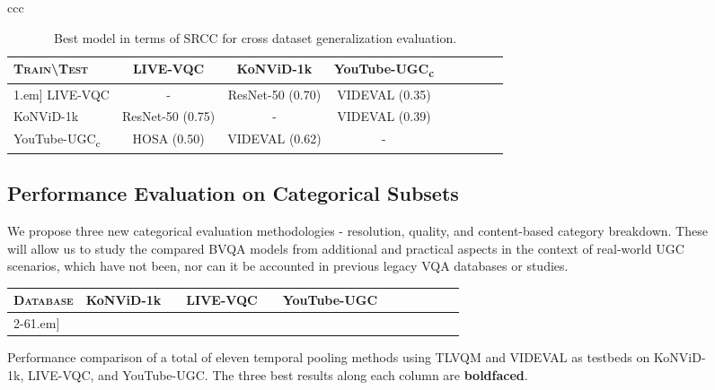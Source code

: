 \documentclass[journal]{IEEEtran}
\begin{document}
\begin{figure}[!t]
\begin{tabular}{ccc}
\begin{table}[!t]
\setlength{\tabcolsep}{3.5pt}
\renewcommand{\arraystretch}{1.1}
\centering
\caption{Best model in terms of SRCC for cross dataset generalization evaluation.}
\label{table:cross_dataset_srcc}
\begin{tabular}{lcccccccc}
\toprule
\textsc{Train}\textbackslash\textsc{Test}  & LIVE-VQC &  KoNViD-1k &  YouTube-UGC\textsubscript{c} \\
\hline\-1.em]
 LIVE-VQC & - &   ResNet-50 (0.70)  & VIDEVAL (0.35)    \\
 KoNViD-1k & ResNet-50 (0.75) & - & VIDEVAL (0.39)  \\
 YouTube-UGC\textsubscript{c} & HOSA (0.50)  &  VIDEVAL (0.62)  & -    \\
\bottomrule
\end{tabular}
\end{table}

\subsection{Performance Evaluation on Categorical Subsets}

We propose three new categorical evaluation methodologies - resolution, quality, and content-based category breakdown. These will allow us to study the compared BVQA models from additional and practical aspects in the context of real-world UGC scenarios, which have not been, nor can it be accounted in previous legacy VQA databases or studies.

\begin{table*}[!t]
\setlength{\tabcolsep}{4pt}
\renewcommand{\arraystretch}{1.1}
\centering
\caption{{Performance comparison of a total of eleven temporal pooling methods using TLVQM and VIDEVAL as testbeds on KoNViD-1k, LIVE-VQC, and YouTube-UGC. The three best results along each column are \textbf{boldfaced}.}}
\label{table:pooling}
\begin{tabular}{lccccccccccccccccccccccc}
\toprule
\textsc{Database} & \multicolumn{5}{c}{KoNViD-1k} & & \multicolumn{5}{c}{LIVE-VQC} & & \multicolumn{5}{c}{YouTube-UGC} \\ \cline{2-6}\cline{8-12}\cline{14-18}\-1.em]


\end{tabular}
\end{table*}
\end{tabular}
\end{figure}
\end{document}
